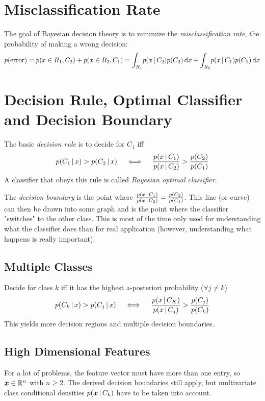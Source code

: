 	\section{Misclassification Rate}
		The goal of Bayesian decision theory is to minimize the \emph{misclassification rate}, the probability of making a wrong decision:
		\begin{align}
			p(\textrm{error}) = p(x \in R_1, C_2) + p(x \in R_2, C_1) = \int_{R_1} \! p(x \,\vert\, C_2) p(C_2) \dd{x} + \int_{R_2} \! p(x \,\vert\, C_1) p(C_1) \dd{x}
		\end{align}

	\section{Decision Rule, Optimal Classifier and Decision Boundary}
		\label{sec:bayesianDecisionRule}

		The basic \emph{decision rule} is to decide for \(C_1\) iff
		\begin{align}
			p(C_1 \,\vert\, x) > p(C_2 \,\vert\, x) \quad\iff\quad \frac{p(x \,\vert\, C_1)}{p(x \,\vert\, C_2)} > \frac{p(C_2)}{p(C_1)}
		\end{align}
		A classifier that obeys this rule is called \emph{Bayesian optimal classifier}.

		The \emph{decision boundary} is the point where \( \frac{p(x \,\vert\, C_1)}{p(x \,\vert\, C_2)} = \frac{p(C_2)}{p(C_1)} \). This line (or curve) can then be drawn into some graph and is the point where the classifier "switches" to the other class. This is most of the time only used for understanding what the classifier does than for real application (however, understanding what happens is really important).

		\subsection{Multiple Classes}
			Decide for class \(k\) iff it has the highest a-posteriori probability (\(\forall j \neq k\))
			\begin{align}
				p(C_k \,\vert\, x) > p(C_j \,\vert\, x) \quad\iff\quad \frac{p(x \,\vert\, C_K)}{p(x \,\vert\, C_j)} > \frac{p(C_j)}{p(C_k)}
			\end{align}
			This yields more decision regions and multiple decision boundaries.

		\subsection{High Dimensional Features}
			For a lot of problems, the feature vector must have more than one entry, so \( \bm{x} \in \mathbb{R}^n \) with \( n \geq 2 \). The derived decision boundaries still apply, but multivariate class conditional densities \( p(\bm{x} \,\vert\, C_k) \) have to be taken into account.

